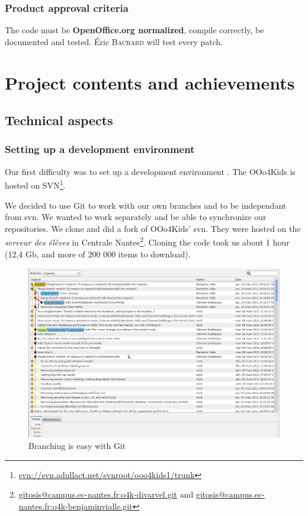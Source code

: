\documentclass[a4paper,11pt]{article}
\begin{document}
\subsubsection*{Product approval criteria}

The code must be  \textbf{OpenOffice.org normalized}, compile correctly, be
documented and tested. Éric \textsc{Bachard} will test every patch.

\newpage

\fancyfoot[C]{\thepage}
\section*{Project contents and achievements}

\subsection*{Technical aspects}

\subsubsection*{Setting up a development environment}


Our first difficulty was to set up a development environment . The OOo4Kids is
hosted on SVN\footnote{\url{svn://svn.adullact.net/svnroot/ooo4kids1/trunk}}.

We decided to use Git to work with our own branches and to be independant from
svn. We wanted to work separately and be able to synchronize our repositories.
We clone and did a fork of OOo4Kids' svn. They were hosted on the
\emph{serveur des élèves} in Centrale
Nantes\footnote{\url{gitosis@campus.ec-nantes.fr:o4k-divarvel.git} and
\url{gitosis@campus.ec-nantes.fr:o4k-benjaminvialle.git}}.  Cloning the code
took us about 1 hour (12,4 Gb, and more of 200 000 items to download).
   
\begin{figure}[!h]
\centering
\includegraphics[scale=0.3]{images/Gitg.png}
\caption{Branching is easy with Git}
\end{figure}   
   
\end{document}
